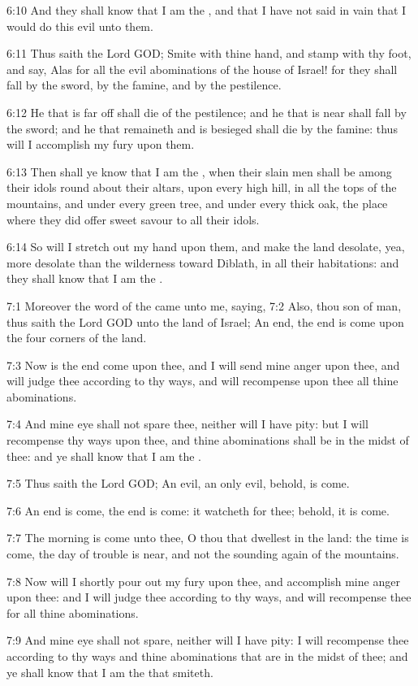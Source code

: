 6:10 And they shall know that I am the \LORD, and that I have not said in vain that I would do this evil unto them.

6:11 Thus saith the Lord GOD; Smite with thine hand, and stamp with thy foot, and say, Alas for all the evil abominations of the house of Israel! for they shall fall by the sword, by the famine, and by the pestilence.

6:12 He that is far off shall die of the pestilence; and he that is near shall fall by the sword; and he that remaineth and is besieged shall die by the famine: thus will I accomplish my fury upon them.

6:13 Then shall ye know that I am the \LORD, when their slain men shall be among their idols round about their altars, upon every high hill, in all the tops of the mountains, and under every green tree, and under every thick oak, the place where they did offer sweet savour to all their idols.

6:14 So will I stretch out my hand upon them, and make the land desolate, yea, more desolate than the wilderness toward Diblath, in all their habitations: and they shall know that I am the \LORD.

7:1 Moreover the word of the \LORD came unto me, saying, 7:2 Also, thou son of man, thus saith the Lord GOD unto the land of Israel; An end, the end is come upon the four corners of the land.

7:3 Now is the end come upon thee, and I will send mine anger upon thee, and will judge thee according to thy ways, and will recompense upon thee all thine abominations.

7:4 And mine eye shall not spare thee, neither will I have pity: but I will recompense thy ways upon thee, and thine abominations shall be in the midst of thee: and ye shall know that I am the \LORD.

7:5 Thus saith the Lord GOD; An evil, an only evil, behold, is come.

7:6 An end is come, the end is come: it watcheth for thee; behold, it is come.

7:7 The morning is come unto thee, O thou that dwellest in the land: the time is come, the day of trouble is near, and not the sounding again of the mountains.

7:8 Now will I shortly pour out my fury upon thee, and accomplish mine anger upon thee: and I will judge thee according to thy ways, and will recompense thee for all thine abominations.

7:9 And mine eye shall not spare, neither will I have pity: I will recompense thee according to thy ways and thine abominations that are in the midst of thee; and ye shall know that I am the \LORD that smiteth.

